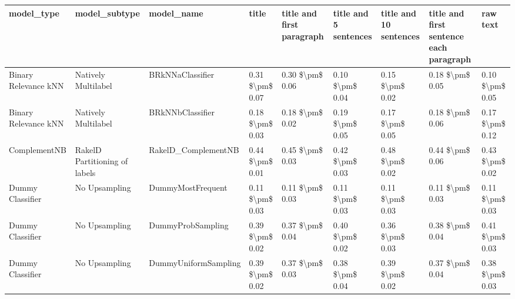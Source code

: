 \begin{tabular}{lllllllll}
\toprule
                     model\_type &                 model\_subtype &                                   model\_name &           title & title and first paragraph & title and 5 sentences & title and 10 sentences & title and first sentence each paragraph &            raw text \\
\midrule
           Binary Relevance kNN &           Natively Multilabel &                             BRkNNaClassifier & 0.31 \$\textbackslash pm\$ 0.07 &           0.30 \$\textbackslash pm\$ 0.06 &       0.10 \$\textbackslash pm\$ 0.04 &        0.15 \$\textbackslash pm\$ 0.02 &                         0.18 \$\textbackslash pm\$ 0.05 &     0.10 \$\textbackslash pm\$ 0.05 \\
           Binary Relevance kNN &           Natively Multilabel &                             BRkNNbClassifier & 0.18 \$\textbackslash pm\$ 0.03 &           0.18 \$\textbackslash pm\$ 0.02 &       0.19 \$\textbackslash pm\$ 0.05 &        0.17 \$\textbackslash pm\$ 0.05 &                         0.18 \$\textbackslash pm\$ 0.06 &     0.17 \$\textbackslash pm\$ 0.12 \\
                   ComplementNB & RakelD Partitioning of labels &                          RakelD\_ComplementNB & 0.44 \$\textbackslash pm\$ 0.01 &           0.45 \$\textbackslash pm\$ 0.03 &       0.42 \$\textbackslash pm\$ 0.03 &        0.48 \$\textbackslash pm\$ 0.02 &                         0.44 \$\textbackslash pm\$ 0.06 &     0.43 \$\textbackslash pm\$ 0.02 \\
               Dummy Classifier &                 No Upsampling &                            DummyMostFrequent & 0.11 \$\textbackslash pm\$ 0.03 &           0.11 \$\textbackslash pm\$ 0.03 &       0.11 \$\textbackslash pm\$ 0.03 &        0.11 \$\textbackslash pm\$ 0.03 &                         0.11 \$\textbackslash pm\$ 0.03 &     0.11 \$\textbackslash pm\$ 0.03 \\
               Dummy Classifier &                 No Upsampling &                            DummyProbSampling & 0.39 \$\textbackslash pm\$ 0.02 &           0.37 \$\textbackslash pm\$ 0.04 &       0.40 \$\textbackslash pm\$ 0.02 &        0.36 \$\textbackslash pm\$ 0.03 &                         0.38 \$\textbackslash pm\$ 0.04 &     0.41 \$\textbackslash pm\$ 0.03 \\
               Dummy Classifier &                 No Upsampling &                         DummyUniformSampling & 0.39 \$\textbackslash pm\$ 0.02 &           0.37 \$\textbackslash pm\$ 0.03 &       0.38 \$\textbackslash pm\$ 0.04 &        0.39 \$\textbackslash pm\$ 0.02 &                         0.37 \$\textbackslash pm\$ 0.04 &     0.38 \$\textbackslash pm\$ 0.03 \\

\end{tabular}
